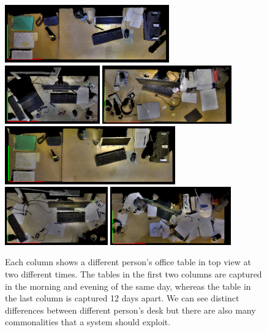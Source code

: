 \documentclass[letterpaper, 10 pt, conference]{ieeeconf}  %
\begin{document}
\begin{figure}
\begin{center}
\includegraphics[height=2.5cm]{David_Mor_131110} \quad
\includegraphics[height=2.5cm]{Nils_Mor_131111} \quad
\includegraphics[height=2.5cm]{Puren_Eve_131029}\\ \smallskip
\includegraphics[height=2.5cm]{David_Eve_131110} \enskip
\includegraphics[height=2.5cm]{Nils_Eve_131111} \enskip
\includegraphics[height=2.5cm]{Puren_Mor_131110}
\caption{Each column shows a different person's office table in top view at two different times. The tables in the first two columns are captured in the morning and evening of the same day, whereas the table in the last column is captured 12 days apart. We can see distinct differences between different person's desk but there are also many commonalities that a system should exploit.}
\label{fig:Example Scenes}
\end{center}
\end{figure}
\end{document}
